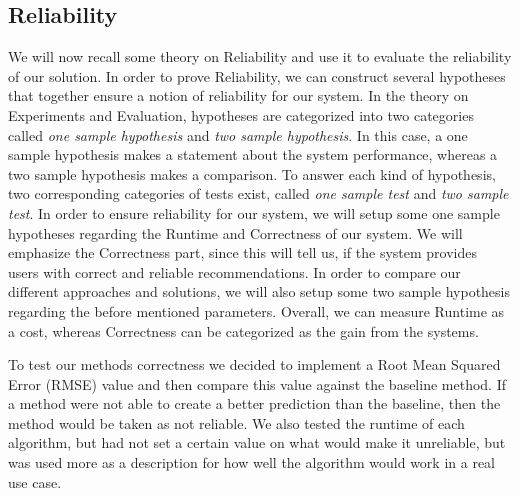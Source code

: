\subsection{Reliability}
We will now recall some theory on Reliability and use it to evaluate the reliability of our solution. In order to prove Reliability, we can construct several hypotheses that together ensure a notion of reliability for our system. In the theory on
Experiments and Evaluation, hypotheses are categorized into two categories called \textit{one sample hypothesis} and \textit{two sample hypothesis}. In this case, a one sample hypothesis makes a statement about the system performance, whereas a two sample hypothesis makes a comparison. To answer each kind of hypothesis, two corresponding categories of tests exist, called \textit{one sample test} and \textit{two sample test}.
In order to ensure reliability for our system, we will setup some one sample hypotheses regarding the Runtime and Correctness of our system. We will emphasize the Correctness part, since this will tell us, if the system provides users with correct and reliable recommendations. In order to compare our different approaches and solutions, we will also setup some two sample hypothesis regarding the before mentioned parameters. Overall, we can measure Runtime as a cost, whereas Correctness can be categorized as the gain from the systems.

To test our methods correctness we decided to implement a Root Mean Squared Error (RMSE) value and then compare this value against the baseline method. If a method were not able to create a better prediction than the baseline, then the method would be taken as not reliable.
We also tested the runtime of each algorithm, but had not set a certain value on what would make it unreliable, but was used more as a description for how well the algorithm would work in a real use case.



